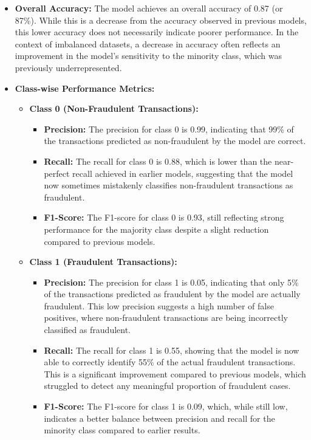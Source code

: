 \documentclass[12pt,a4paper]{report}
\begin{document}
\begin{itemize}
    \item \textbf{Overall Accuracy:} The model achieves an overall accuracy of 0.87 (or 87\%). While this is a decrease from the accuracy observed in previous models, this lower accuracy does not necessarily indicate poorer performance. In the context of imbalanced datasets, a decrease in accuracy often reflects an improvement in the model's sensitivity to the minority class, which was previously underrepresented.

    \item \textbf{Class-wise Performance Metrics:}
    \begin{itemize}
        \item \textbf{Class 0 (Non-Fraudulent Transactions):}
        \begin{itemize}
            \item \textbf{Precision:} The precision for class 0 is 0.99, indicating that 99\% of the transactions predicted as non-fraudulent by the model are correct.
            \item \textbf{Recall:} The recall for class 0 is 0.88, which is lower than the near-perfect recall achieved in earlier models, suggesting that the model now sometimes mistakenly classifies non-fraudulent transactions as fraudulent.
            \item \textbf{F1-Score:} The F1-score for class 0 is 0.93, still reflecting strong performance for the majority class despite a slight reduction compared to previous models.
        \end{itemize}
        \item \textbf{Class 1 (Fraudulent Transactions):}
        \begin{itemize}
            \item \textbf{Precision:} The precision for class 1 is 0.05, indicating that only 5\% of the transactions predicted as fraudulent by the model are actually fraudulent. This low precision suggests a high number of false positives, where non-fraudulent transactions are being incorrectly classified as fraudulent.
            \item \textbf{Recall:} The recall for class 1 is 0.55, showing that the model is now able to correctly identify 55\% of the actual fraudulent transactions. This is a significant improvement compared to previous models, which struggled to detect any meaningful proportion of fraudulent cases.
            \item \textbf{F1-Score:} The F1-score for class 1 is 0.09, which, while still low, indicates a better balance between precision and recall for the minority class compared to earlier results.\\
        \end{itemize}
    \end{itemize}


\end{itemize}
\end{document}

